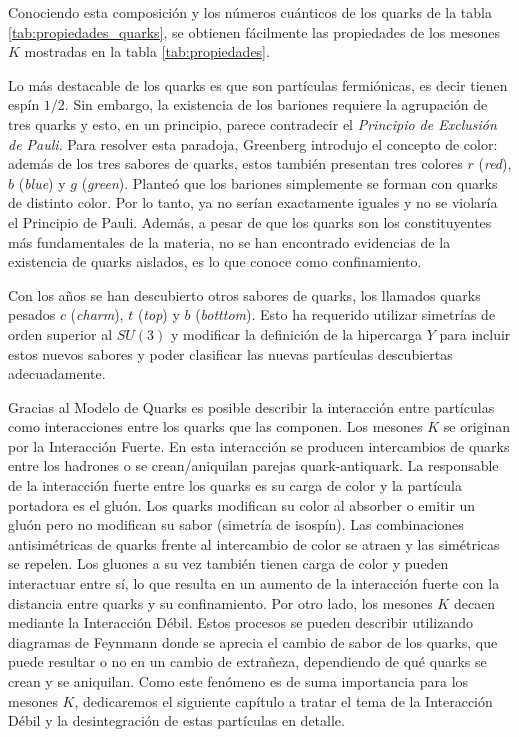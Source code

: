 Conociendo esta composición y los números cuánticos de los quarks de la tabla \ref{tab:propiedades_quarks}, se obtienen fácilmente las propiedades de los mesones $K$ mostradas en la tabla \ref{tab:propiedades}.

Lo más destacable de los quarks es que son partículas fermiónicas, es decir tienen espín $1/2$. Sin embargo, la existencia de los bariones requiere la agrupación de tres quarks y esto, en un principio, parece contradecir el \textit{Principio de Exclusión de Pauli}. Para resolver esta paradoja, Greenberg introdujo el concepto de color: además de los tres sabores de quarks, estos también presentan tres colores $r$ (\textit{red}), $b$ (\textit{blue}) y $g$ (\textit{green}). Planteó que los bariones simplemente se forman con quarks de distinto color. Por lo tanto, ya no serían exactamente iguales y no se violaría el Principio de Pauli.\cite{Griffiths2008}  Además, a pesar de que los quarks son los constituyentes más fundamentales de la materia, no se han encontrado evidencias de la existencia de quarks aislados, es lo que conoce como confinamiento.\cite{Pais}

Con los años se han descubierto otros sabores de quarks, los llamados quarks pesados $c$ (\textit{charm}), $t$ (\textit{top}) y $b$ (\textit{botttom}). Esto ha requerido utilizar simetrías de orden superior al $SU(3)$ y modificar la definición de la hipercarga $Y$ para incluir estos nuevos sabores y poder clasificar las nuevas partículas descubiertas adecuadamente.

Gracias al Modelo de Quarks es posible describir la interacción entre partículas como interacciones entre los quarks que las componen. Los mesones $K$ se originan por la Interacción Fuerte. En esta interacción se producen intercambios de quarks entre los hadrones o se crean/aniquilan parejas quark-antiquark. La responsable de la interacción fuerte entre los quarks es su carga de color y la partícula portadora es el gluón.  Los quarks modifican su color al absorber o emitir un gluón pero no modifican su sabor (simetría de isospín). Las combinaciones antisimétricas de quarks frente al intercambio de color se atraen y las simétricas se repelen. Los gluones a su vez también tienen carga de color y pueden interactuar entre sí, lo que resulta en un aumento de la interacción fuerte con la distancia entre quarks y su confinamiento.\cite{notas2020} Por otro lado, los mesones $K$ decaen mediante la Interacción Débil. Estos procesos se pueden describir utilizando diagramas de Feynmann donde se aprecia el cambio de sabor de los quarks, que puede resultar o no en un cambio de extrañeza, dependiendo de qué quarks se crean y se aniquilan. Como este fenómeno es de suma importancia para los mesones $K$, dedicaremos el siguiente capítulo a tratar el tema de la Interacción Débil y la desintegración de estas partículas en detalle.\\




